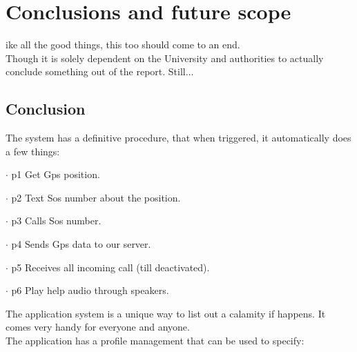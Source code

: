 %
%
\let\textcircled=\pgftextcircled
\chapter{Conclusions and future scope}
\label{chap:intro}

ike all the good things, this too should come to an end.\\
Though it is solely dependent on the University and authorities to actually conclude something out of the report. Still...



\section{Conclusion}
\label{sec:sec01}

The system has a definitive procedure, that when triggered, it automatically does a few things:

  \begin{description}

\item{$\cdot$ p1} Get Gps position.
\item{$\cdot$ p2} Text Sos number about the position.
\item{$\cdot$ p3} Calls Sos number.
\item{$\cdot$ p4} Sends Gps data to our server.
\item{$\cdot$ p5} Receives all incoming call (till deactivated).
\item{$\cdot$ p6} Play help audio through speakers.

\end{description}

The application system is a unique way to list out a calamity if happens.
It comes very handy for everyone and anyone. \\
The application has a profile management that can be used to specify: 
\clearpage

